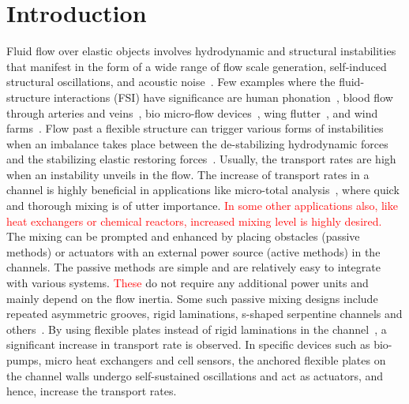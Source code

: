 \documentclass[aps,pre,twocolumn,aps,longbibliography]{revtex4-1}
\begin{document}
	
	\maketitle
	
	
	\section{Introduction}
	Fluid flow over elastic objects involves hydrodynamic and structural instabilities that manifest in the form of a wide range of flow scale generation, self-induced structural oscillations, and acoustic noise~\cite{Balachandar1999, Zhang2000, Hall2001, Mahadevan2004, Vandenberghe2004, Shelley2011}. Few examples where the fluid-structure interactions (FSI) have significance are human phonation~\citep{Mittal2013}, blood flow through arteries and veins~\citep{Manz2002,Verzicco2009}, bio micro-flow devices~\cite{Khatvakar2007}, wing flutter~\cite{Taneda1968}, and wind farms~\cite{Klienstreuer2009}. Flow past a flexible structure can trigger various forms of instabilities when an imbalance takes place between the de-stabilizing hydrodynamic forces and the stabilizing elastic restoring forces~\citep{Taneda1968, Zhang2000, Watanabe2002, Eloy2008, ZhuPeskin2002, Alben2008}. Usually, the transport rates are high when an instability unveils in the flow. The increase of transport rates in a channel is highly beneficial in applications like micro-total analysis~\citep{Manz2002}, where quick and thorough mixing is of utter importance. \textcolor{red}{In some other applications also, like heat exchangers or chemical reactors, increased mixing level is highly desired.} The mixing can be prompted and enhanced by placing obstacles (passive methods) or actuators with an external power source (active methods) in the channels. The passive methods are simple and are relatively easy to integrate with various systems. \textcolor{red}{These} do not require any additional power units and mainly depend on the flow inertia. Some such passive mixing designs include repeated asymmetric grooves, rigid laminations, s-shaped serpentine channels and others~\citep{Whitesides2002, Nguyen2005, Squires2005, Kashid2011, Kang2015}. By using flexible plates instead of rigid laminations in the channel~\cite{LambertRangel2010, Khatvakar2007}, a significant increase in transport rate is observed. In specific devices such as bio-pumps, micro heat exchangers and cell sensors, the anchored flexible plates on the channel walls undergo self-sustained oscillations and act as actuators, and hence, increase the transport rates.
	
\end{document}
